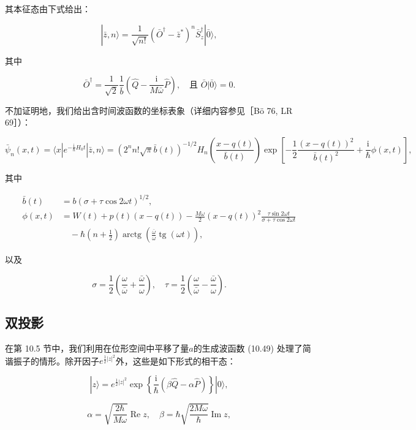 其本征态由下式给出：

\[
|\bar{z},n\rangle=\frac{1}{\sqrt{n!}}(\bar{O}^{\dagger}-\bar{z}^{*})^{n}\bar{S}^{\dagger}_{z}|\bar{0}\rangle,
\]

其中

\[
\bar{O}^{\dagger}=\frac{1}{\sqrt{2}}\frac{1}{\bar{b}}\left(\hat{Q}-\frac{\mathrm{i}}{M\bar{\omega}}\hat{P}\right),\quad\text{且 }\bar{O}|\bar{0}\rangle=0.
\]

不加证明地，我们给出含时间波函数的坐标表象（详细内容参见［Bö 76, LR 69］）：

\begin{equation}
\bar{\psi}_{n}(x,t)=\langle x|e^{-\frac{\mathrm{i}}{\hbar}H_{0}t}|\bar{z},n\rangle=(2^{n}n!\sqrt{\pi}\bar{b}(t))^{-1/2}H_{n}\left(\frac{x-q(t)}{\bar{b}(t)}\right)\exp\left[-\frac{1}{2}\frac{(x-q(t))^{2}}{\bar{b}(t)^{2}}+\frac{\mathrm{i}}{\hbar}\phi(x,t)\right],\label{eq:10.89a}
\end{equation}

其中

\begin{align}
\bar{b}(t) & =b(\sigma+\tau\cos2\omega t)^{1/2},\nonumber \\
\phi(x,t) & =W(t)+p(t)(x-q(t))-\frac{M\omega}{2}(x-q(t))^{2}\frac{\tau\sin2\omega t}{\sigma+\tau\cos2\omega t}\nonumber \\
 & \quad-\hbar\left(n+\frac{1}{2}\right)\operatorname{arctg}\left(\frac{\bar{\omega}}{\omega}\operatorname{tg}(\omega t)\right),\label{eq:10.89b}
\end{align}

以及

\begin{equation}
\sigma=\frac{1}{2}\left(\frac{\omega}{\bar{\omega}}+\frac{\bar{\omega}}{\omega}\right),\quad\tau=\frac{1}{2}\left(\frac{\omega}{\bar{\omega}}-\frac{\bar{\omega}}{\omega}\right).\label{eq:10.89c}
\end{equation}


\subsection{双投影}

在第 10.5 节中，我们利用在位形空间中平移了量$a$的生成波函数 (10.49) 处理了简谐振子的情形。除开因子$e^{\frac{1}{2}|z|^{2}}$外，这些是如下形式的相干态：

\[
|z\rangle=e^{\frac{1}{2}|z|^{2}}\exp\left\{ \frac{\mathrm{i}}{\hbar}(\beta\hat{Q}-\alpha\hat{P})\right\} |0\rangle,
\]

\[
\alpha=\sqrt{\frac{2\hbar}{M\omega}}\operatorname{Re}z,\quad\beta=\hbar\sqrt{\frac{2M\omega}{\hbar}}\operatorname{Im}z,
\]

